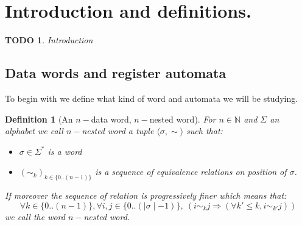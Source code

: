 \documentclass[a4paper,10pt]{report}
\title{}
\author{}
\newtheorem{df}{Definition}
\newtheorem{td}{TODO}
\theoremstyle{remark}
\newcommand{\seg}[1]{\{#1\}}
\newcommand{\segw}[1]{\seg{0..(\mid #1\mid -1)}}
\newcommand{\ts}{\seg{0 .. (n-1)}}
\begin{document}
\maketitle

\section{Introduction and definitions.}

\begin{td}
  Introduction
\end{td}

\subsection{Data words and register automata}

To begin with we define what kind of word and automata we will be studying.

\begin{df}[An $n-$data word, $n-$nested word]
 For $n \in \mathbb{N}$ and $\Sigma$ an alphabet we call $n-$nested word a tuple  
 $\langle \sigma , \sim   \rangle$
 such that:
  \begin{itemize}
   \item $\sigma \in \Sigma^* $ is a word
   \item $(\sim_k)_{k \in \ts }$ is a sequence of equivalence relations on position of $\sigma$. 
  \end{itemize}
  If moreover the sequence of relation is progressively finer which means that:  
  $$\forall k \in \ts, \forall i,j \in \segw{\sigma}, \ (i \sim_k j \Rightarrow \left ( \forall k' \leq k, i \sim_{k'} j \right )) $$ 
   we call the word $n-$nested word.
\end{df}
\end{document}
